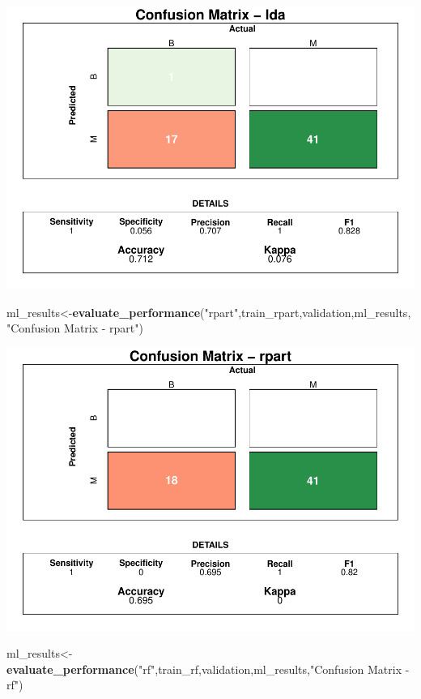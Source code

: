 \documentclass[]{article}
\newenvironment{Shaded}{\begin{snugshade}}{\end{snugshade}}
\newcommand{\KeywordTok}[1]{\textcolor[rgb]{0.13,0.29,0.53}{\textbf{#1}}}
\newcommand{\NormalTok}[1]{#1}
\newcommand{\StringTok}[1]{\textcolor[rgb]{0.31,0.60,0.02}{#1}}
\begin{document}
\includegraphics{LiverDisease_files/figure-latex/unnamed-chunk-43-1.pdf}

\begin{Shaded}
\begin{Highlighting}[]
\NormalTok{ml_results<-}\KeywordTok{evaluate_performance}\NormalTok{(}\StringTok{"rpart"}\NormalTok{,train_rpart,validation,ml_results, }\StringTok{"Confusion Matrix - rpart"}\NormalTok{)}
\end{Highlighting}
\end{Shaded}

\includegraphics{LiverDisease_files/figure-latex/unnamed-chunk-44-1.pdf}

\begin{Shaded}
\begin{Highlighting}[]
\NormalTok{ml_results<-}\KeywordTok{evaluate_performance}\NormalTok{(}\StringTok{"rf"}\NormalTok{,train_rf,validation,ml_results,}\StringTok{"Confusion Matrix - rf"}\NormalTok{)}
\end{Highlighting}
\end{Shaded}
\end{document}
